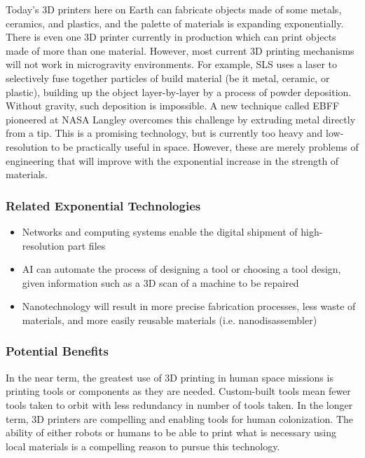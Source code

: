 \documentclass[letter,11pt]{article}
\begin{document}
Today's 3D printers here on Earth can fabricate objects made of some metals,
ceramics, and plastics, and the palette of materials is expanding
exponentially.  There is even one 3D printer currently in production which can
print objects made of more than one material. However, most current 3D printing
mechanisms will not work in microgravity environments. For example, \gls*{SLS}
uses a laser to selectively fuse together particles of build material (be it
metal, ceramic, or plastic), building up the object layer-by-layer by a process
of powder deposition. Without gravity, such deposition is impossible. A new
technique called \gls*{EBFF} \cite{Taminger2006}
pioneered at NASA Langley overcomes this challenge by extruding metal directly
from a tip. This is a promising technology, but is currently too heavy and
low-resolution to be practically useful in space.  However, these are merely
problems of engineering that will improve with the exponential increase in the
strength of materials.

\subsubsection{Related Exponential Technologies}

\begin{itemize}
  \item Networks and computing systems enable the digital shipment of high-resolution
part files \\
  \item AI can automate the process of designing a tool or choosing a tool design,
given information such as a 3D scan of a machine to be repaired \\ \item Nanotechnology will result in more precise fabrication processes, less waste of
materials, and more easily reusable materials (i.e. nanodisassembler)
\end{itemize}

\subsubsection{Potential Benefits}

In the near term, the greatest use of 3D printing in human space missions is printing tools or components as they are needed. Custom-built tools mean fewer tools taken to orbit with less redundancy in number of tools taken. In the longer term, 3D printers are compelling and enabling tools for human colonization. The ability of either robots or humans to be able to print what is necessary using local materials is a compelling reason to pursue this technology.
\end{document}
